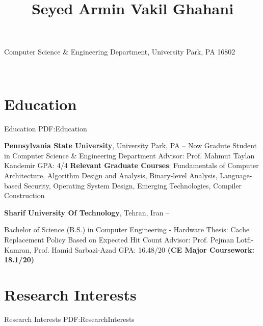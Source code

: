 \documentclass[a4paper,9pt,oneside]{article}
\newcommand{\CVAuthor}{Seyed Armin Vakil Ghahani}
\begin{document}

\title{\CVAuthor}
\begin{subtitle}

\faInstitution Computer Science \& Engineering Department, University Park, PA 16802
\par
\Large{
\href{https://arminvakil.github.io/}{\faGlobe}
\href{mailto:arminvakil@psu.edu}{\faEnvelope}
\href{https://www.linkedin.com/in/arminvakil}{\faLinkedinSquare}
\href{https://github.com/arminvakil}{\faGithubSquare}
\href{https://scholar.google.com/citations?user=OHnTCysAAAAJ&hl=en}{\faGraduationCap}}
\
\end{subtitle}

\begin{body}


\section
{Education}
{Education}
{PDF:Education}

\textbf{Pennsylvania State University},
University Park, PA
\hfill
{} --
Now
\GapNoBreak
\BulletItem
Gradute Student in
Computer Science \& Engineering Department
\SubBulletItem
Advisor: Prof. Mahmut Taylan Kandemir
\SubBulletItem
GPA: 4/4
\SubBulletItem
\textbf{Relevant Graduate Courses}: Fundamentals of Computer Architecture, Algorithm Design and Analysis, Binary-level Analysis, Language-based Security, Operating System Design, Emerging Technologies, Compiler Construction

\BigGap

\textbf{Sharif University Of Technology},
Tehran, Iran
\hfill
{} --

\GapNoBreak
\BulletItem
Bachelor of Science (B.S.) in
Computer Engineering - Hardware
\SubBulletItem
Thesis: Cache Replacement Policy Based on Expected Hit Count
\newline
Advisor: Prof. Pejman Lotfi-Kamran, Prof. Hamid Sarbazi-Azad
\SubBulletItem
GPA: 16.48/20 \textbf{(CE Major Coursework: 18.1/20)}



\section
{Research Interests}
{Research Interests}
{PDF:ResearchInterests}


\end{body}
\end{document}
